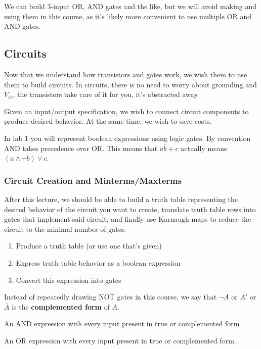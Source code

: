 We can build 3-input OR, AND gates and the like, but we will avoid making and using them in this course, as it's likely more convenient to use multiple OR and AND gates.

\subsection{Circuits}

Now that we understand how transistors and gates work, we wish them to use them to build circuits. In circuits, there is no need to worry about grounding and $V_{cc}$, the transistors take care of it for you, it's abstracted away.

\begin{problem}
    Given an input/output specification, we wish to connect circuit components to produce desired behavior. At the same time, we wish to save costs. \label{prob:nand}
\end{problem}

In lab 1 you will represent boolean expressions using logic gates. By convention AND takes precedence over OR. This means that $a \overline{b} + c$ actually means $(a \wedge \neg b) \vee c$. 

\subsubsection*{Circuit Creation and Minterms/Maxterms}

After this lecture, we should be able to build a truth table representing the desired behavior of the circuit you want to create, translate truth table rows into gates that implement said circuit, and finally use Karnaugh maps to reduce the circuit to the minimal number of gates.
\begin{enumerate}
    \item Produce a truth table (or use one that's given)
    \item Express truth table behavior as a boolean expression
    \item Convert this expression into gates
\end{enumerate}

Instead of repeatedly drawing NOT gates in this course, we say that $\neg A$ or $A'$ or $\overline{A}$ is the \textbf{complemented form} of $A$.

\begin{definition}[Minterm]
An AND expression with every input present in true or complemented form
\end{definition}
\begin{definition}[Maxterm]
An OR expression with every input present in true or complemented form.
\end{definition}

